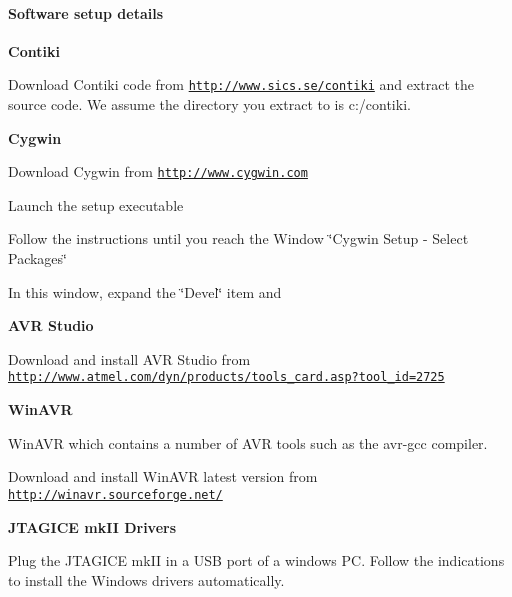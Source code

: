 \hypertarget{a00058_annex_software}{}\paragraph{\-Software setup details}\label{a00058_annex_software}
{\bfseries \-Contiki}\par
 \-Download \-Contiki code from \href{http://www.sics.se/contiki}{\tt http\-://www.\-sics.\-se/contiki} and extract the source code. \-We assume the directory you extract to is c\-:/contiki.

{\bfseries \-Cygwin}\par
 \begin{DoxyItemize}
\item \-Download \-Cygwin from \href{http://www.cygwin.com}{\tt http\-://www.\-cygwin.\-com} \item \-Launch the setup executable \item \-Follow the instructions until you reach the \-Window \char`\"{}\-Cygwin 
\-Setup -\/ Select Packages\char`\"{} \item \-In this window, expand the \char`\"{}\-Devel\char`\"{} item and\end{DoxyItemize}
{\bfseries \-A\-V\-R \-Studio}\par
 \-Download and install \-A\-V\-R \-Studio from \href{http://www.atmel.com/dyn/products/tools_card.asp?tool_id=2725}{\tt http\-://www.\-atmel.\-com/dyn/products/tools\-\_\-card.\-asp?tool\-\_\-id=2725}

{\bfseries \-Win\-A\-V\-R}\par
 \-Win\-A\-V\-R which contains a number of \-A\-V\-R tools such as the avr-\/gcc compiler.

\-Download and install \-Win\-A\-V\-R latest version from \href{http://winavr.sourceforge.net/}{\tt http\-://winavr.\-sourceforge.\-net/}

{\bfseries \-J\-T\-A\-G\-I\-C\-E mk\-I\-I \-Drivers}\par
 \-Plug the \-J\-T\-A\-G\-I\-C\-E mk\-I\-I in a \-U\-S\-B port of a windows \-P\-C. \-Follow the indications to install the \-Windows drivers automatically. 